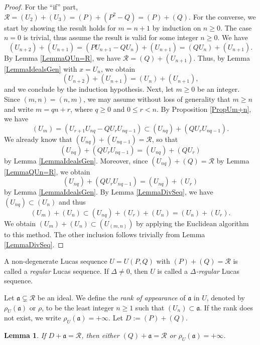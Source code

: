 \documentclass[reqno]{amsart}
\newtheorem{lemma}{Lemma}
\begin{document}
\begin{proof}
    For the ``if'' part, $\mathscr{R}=(U_2)+(U_3) = (P)+(P^2-Q)=(P)+(Q)$. For the converse, we start by showing the result holds for $m=n+1$ by induction on $n\geq 0$. The case $n=0$ is trivial, thus assume the result is valid for some integer $n\geq 0$. We have
    \[
    (U_{n+2})+(U_{n+1}) = (PU_{n+1}-QU_n)+(U_{n+1}) = (QU_n)+(U_{n+1}).
    \]
    By Lemma \ref{LemmaQUn=R}, we have $\mathscr{R}=(Q)+(U_{n+1})$. Thus, by Lemma \ref{LemmaIdealsGen} with $x=U_n$, we obtain
    \[
    (U_{n+2})+(U_{n+1})=(U_n)+(U_{n+1}),
    \]
    and we conclude by the induction hypothesis. Next, let $m\geq 0$ be an integer. Since $(m,n)=(n,m)$, we may assume without loss of generality that $m\geq n$ and write $m=qn+r$, where $q\geq 0$ and $0\leq r < n$. By Proposition \ref{PropUm+n}, we have
    \[
    (U_m) = (U_{r+1}U_{nq}-QU_rU_{nq-1}) \subset (U_{nq}) + (QU_rU_{nq-1}).
    \]
    We already know that $(U_{nq})+(U_{nq-1})=\mathscr{R}$, so that
    \[
    (U_{nq}) + (QU_rU_{nq-1}) = (U_{nq}) + (QU_r)
    \]
    by Lemma \ref{LemmaIdealsGen}. Moreover, since $(U_{nq})+(Q) = \mathscr{R}$ by Lemma \ref{LemmaQUn=R}, we obtain
    \[
    (U_{nq}) + (QU_rU_{nq-1}) = (U_{nq}) + (U_r)
    \]
    by Lemma \ref{LemmaIdealsGen}. By Lemma \ref{LemmaDivSeq}, we have $(U_{nq})\subset (U_n)$ and thus
    \[
    (U_m)+(U_n) \subset (U_{nq}) + (U_r)+(U_n) = (U_n)+(U_r).
    \]
    We obtain $(U_m)+(U_n) \subset (U_{(m,n)})$ by applying the Euclidean algorithm to this method. The other inclusion follows trivially from Lemma \ref{LemmaDivSeq}.
\end{proof}


A non-degenerate Lucas sequence $U=U(P,Q)$ with $(P)+(Q)=\mathscr{R}$ is called a {\it regular} Lucas sequence. If $\Delta\ne 0$, then $U$ is called a {\it $\Delta$-regular} Lucas sequence. 



Let $\mathfrak{a}\subsetneq \mathscr{R}$ be an ideal. We define the {\it rank of appearance} of $\mathfrak{a}$ in $U$, denoted by $\rho_U(\mathfrak{a})$ or $\rho$, to be the least integer $n\geq1$ such that $(U_n)\subset \mathfrak{a}$. If the rank does not exist, we write $\rho_U(\mathfrak{a})=+\infty$. Let $D:=(P)+(Q)$.



\begin{lemma}\label{LemmaRanknmidQ}
    If $D+\mathfrak{a}=\mathscr{R}$, then either $(Q) + \mathfrak{a} = \mathscr{R}$ or $\rho_U(\mathfrak{a})=+\infty$.
\end{lemma}
\end{document}
